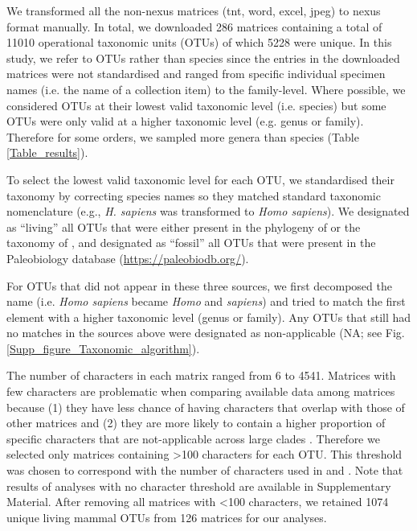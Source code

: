 We transformed all the non-nexus matrices (tnt, word, excel, jpeg) to nexus format manually.
In total, we downloaded 286 matrices containing a total of 11010 operational taxonomic units (OTUs) of which 5228 were unique.
In this study, we refer to OTUs rather than species since the entries in the downloaded matrices were not standardised and ranged from specific individual specimen names (i.e. the name of a collection item) to the family-level.
Where possible, we considered OTUs at their lowest valid taxonomic level (i.e. species) but some OTUs were only valid at a higher taxonomic level (e.g. genus or family).
Therefore for some orders, we sampled more genera than species (Table \ref{Table_results}).

To select the lowest valid taxonomic level for each OTU, we standardised their taxonomy by correcting species names so they matched standard taxonomic nomenclature (e.g., \textit{H. sapiens} was transformed to \textit{Homo sapiens}).
We designated as ``living'' all OTUs that were either present in the phylogeny of \citep{bininda-emondsthe2007} or the taxonomy of \citep{wilson2005mammal}, and designated as ``fossil'' all OTUs that were present in the Paleobiology database (\url{https://paleobiodb.org/}).

For OTUs that did not appear in these three sources, we first decomposed the name (i.e. \textit{Homo sapiens} became \textit{Homo} and \textit{sapiens}) and tried to match the first element with a higher taxonomic level (genus or family).
Any OTUs that still had no matches in the sources above were designated as non-applicable (NA; see Fig. \ref{Supp_figure_Taxonomic_algorithm}).

The number of characters in each matrix ranged from 6 to 4541.
Matrices with few characters are problematic when comparing available data among matrices because (1) they have less chance of having characters that overlap with those of other matrices \citep{wagner2000} and (2) they are more likely to contain a higher proportion of specific characters that are not-applicable across large clades \citep[e.g. ``antler ramifications'' is a character that is only applicable to Cervidae not all mammals][]{Brazeau2011}.
Therefore we selected only matrices containing \textgreater 100 characters for each OTU.
This threshold was chosen to correspond with the number of characters used in \citep{GuillermeCooper} and \citep{harrisonamong-character2014}.
Note that results of analyses with no character threshold are available in Supplementary Material. 
After removing all matrices with \textless 100 characters, we retained 1074 unique living mammal OTUs from 126 matrices for our analyses. %

